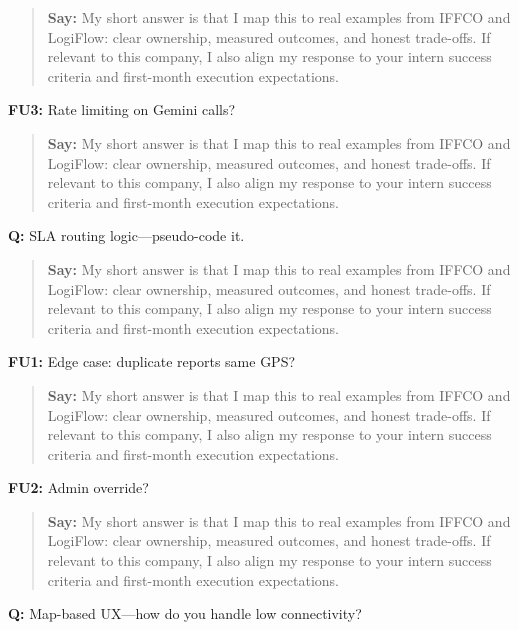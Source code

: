 \documentclass[9pt,a4paper]{article}
\begin{document}
\begin{quote}\small\textbf{Say:} My short answer is that I map this to real examples from IFFCO and LogiFlow: clear ownership, measured outcomes, and honest trade-offs. If relevant to this company, I also align my response to your intern success criteria and first-month execution expectations.\end{quote}
\vspace{2mm}
\textbf{FU3:} Rate limiting on Gemini calls?

\begin{quote}\small\textbf{Say:} My short answer is that I map this to real examples from IFFCO and LogiFlow: clear ownership, measured outcomes, and honest trade-offs. If relevant to this company, I also align my response to your intern success criteria and first-month execution expectations.\end{quote}
\vspace{2mm}
\textbf{Q:} SLA routing logic---pseudo-code it.

\begin{quote}\small\textbf{Say:} My short answer is that I map this to real examples from IFFCO and LogiFlow: clear ownership, measured outcomes, and honest trade-offs. If relevant to this company, I also align my response to your intern success criteria and first-month execution expectations.\end{quote}
\vspace{2mm}
\textbf{FU1:} Edge case: duplicate reports same GPS?

\begin{quote}\small\textbf{Say:} My short answer is that I map this to real examples from IFFCO and LogiFlow: clear ownership, measured outcomes, and honest trade-offs. If relevant to this company, I also align my response to your intern success criteria and first-month execution expectations.\end{quote}
\vspace{2mm}
\textbf{FU2:} Admin override?

\begin{quote}\small\textbf{Say:} My short answer is that I map this to real examples from IFFCO and LogiFlow: clear ownership, measured outcomes, and honest trade-offs. If relevant to this company, I also align my response to your intern success criteria and first-month execution expectations.\end{quote}
\vspace{2mm}
\textbf{Q:} Map-based UX---how do you handle low connectivity?
\end{document}
